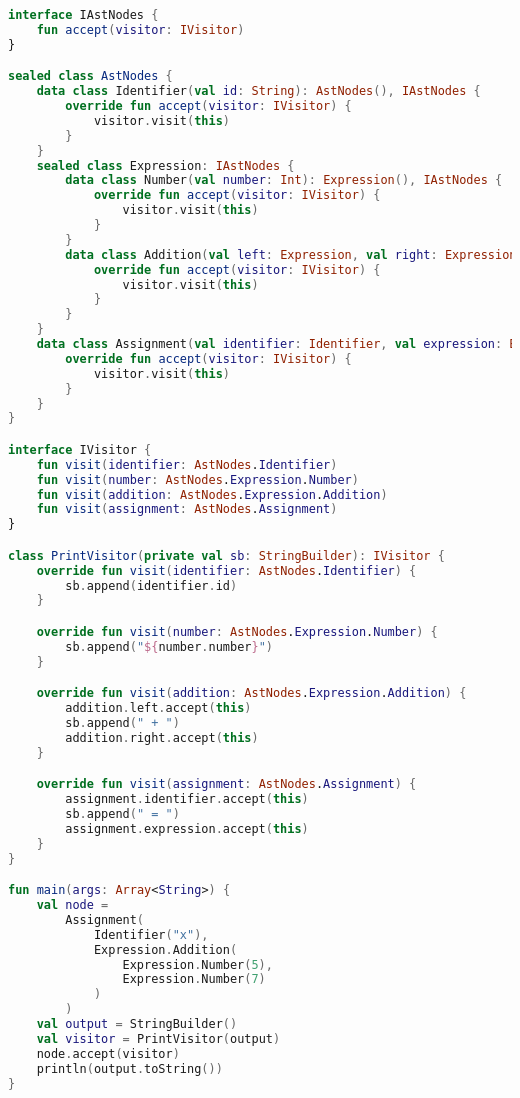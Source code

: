 \begin{lstlisting}[language=Kotlin,label=lis:visitorPattern,caption=Tree traversal using the visitor pattern.]
interface IAstNodes {
	fun accept(visitor: IVisitor)
}

sealed class AstNodes {
	data class Identifier(val id: String): AstNodes(), IAstNodes {
		override fun accept(visitor: IVisitor) {
			visitor.visit(this)
		}
	}
	sealed class Expression: IAstNodes {
		data class Number(val number: Int): Expression(), IAstNodes {
			override fun accept(visitor: IVisitor) {
				visitor.visit(this)
			}
		}
		data class Addition(val left: Expression, val right: Expression) : Expression(), IAstNodes {
			override fun accept(visitor: IVisitor) {
				visitor.visit(this)
			}
		}
	}
	data class Assignment(val identifier: Identifier, val expression: Expression): AstNodes(), IAstNodes {
		override fun accept(visitor: IVisitor) {
			visitor.visit(this)
		}
	}
}

interface IVisitor {
	fun visit(identifier: AstNodes.Identifier)
	fun visit(number: AstNodes.Expression.Number)
	fun visit(addition: AstNodes.Expression.Addition)
	fun visit(assignment: AstNodes.Assignment)
}

class PrintVisitor(private val sb: StringBuilder): IVisitor {
	override fun visit(identifier: AstNodes.Identifier) {
		sb.append(identifier.id)
	}

	override fun visit(number: AstNodes.Expression.Number) {
		sb.append("${number.number}")
	}

	override fun visit(addition: AstNodes.Expression.Addition) {
		addition.left.accept(this)
		sb.append(" + ")
		addition.right.accept(this)
	}

	override fun visit(assignment: AstNodes.Assignment) {
		assignment.identifier.accept(this)
		sb.append(" = ")
		assignment.expression.accept(this)
	}
}

fun main(args: Array<String>) {
	val node =
		Assignment(
			Identifier("x"),
			Expression.Addition(
				Expression.Number(5),
				Expression.Number(7)
			)
		)
	val output = StringBuilder()
	val visitor = PrintVisitor(output)
	node.accept(visitor)
	println(output.toString())
}
\end{lstlisting}

